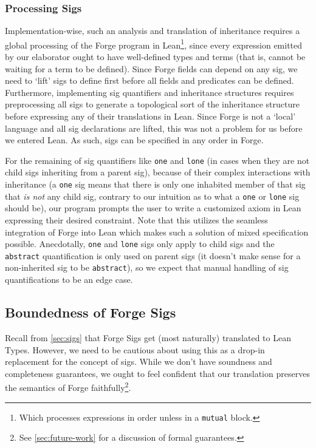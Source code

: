 \subsubsection{Processing Sigs}

Implementation-wise, such an analysis and translation of inheritance requires a global processing of the Forge program in Lean\footnote{Which processes expressions in order unless in a \texttt{mutual} block.}, since every expression emitted by our elaborator ought to have well-defined types and terms (that is, cannot be waiting for a term to be defined). Since Forge fields can depend on any sig, we need to `lift' sigs to define first before all fields and predicates can be defined. Furthermore, implementing sig quantifiers and inheritance structures requires preprocessing all sigs to generate a topological sort of the inheritance structure before expressing any of their translations in Lean. Since Forge is not a `local' language and all sig declarations are lifted, this was not a problem for us before we entered Lean. As such, sigs can be specified in any order in Forge. 

For the remaining of sig quantifiers like \texttt{one} and \texttt{lone} (in cases when they are not child sigs inheriting from a parent sig), because of their complex interactions with inheritance (a \texttt{one} sig means that there is only one inhabited member of that sig that \emph{is not} any child sig, contrary to our intuition as to what a \texttt{one} or \texttt{lone} sig should be), our program prompts the user to write a customized axiom in Lean expressing their desired constraint. Note that this utilizes the seamless integration of Forge into Lean which makes such a solution of mixed specification possible. Anecdotally, \texttt{one} and \texttt{lone} sigs only apply to child sigs and the \texttt{abstract} quantification is only used on parent sigs (it doesn't make sense for a non-inherited sig to be \texttt{abstract}), so we expect that manual handling of sig quantifications to be an edge case. 

\subsection{Boundedness of Forge Sigs}\label{sec:finiteness}
Recall from \cref{sec:sigs} that Forge Sigs get (most naturally) translated to Lean Types. However, we need to be cautious about using this as a drop-in replacement for the concept of sigs. While we don't have soundness and completeness guarantees, we ought to feel confident that our translation preserves the semantics of Forge faithfully\footnote{See \cref{sec:future-work} for a discussion of formal guarantees.}. 

